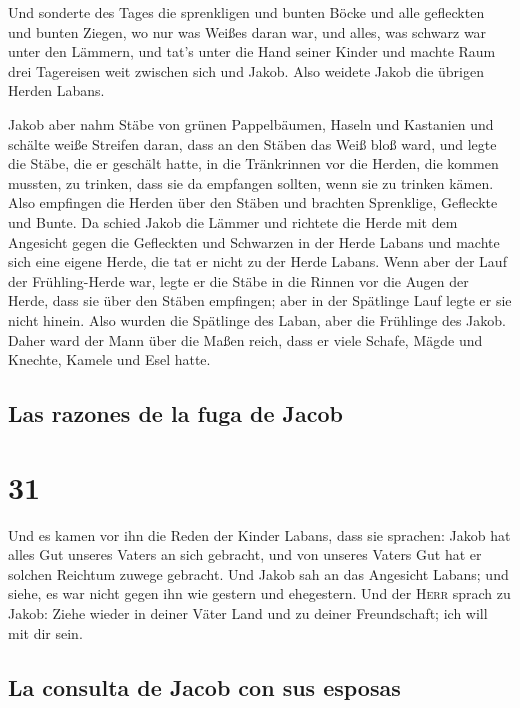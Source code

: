 Und sonderte des Tages die sprenkligen und bunten Böcke
und alle gefleckten und bunten Ziegen, wo nur was Weißes daran war, und
alles, was schwarz war unter den Lämmern, und tat's unter die Hand
seiner Kinder  und machte Raum drei Tagereisen weit
zwischen sich und Jakob. Also weidete Jakob die übrigen Herden Labans.

 Jakob aber nahm Stäbe von grünen Pappelbäumen, Haseln
und Kastanien und schälte weiße Streifen daran, dass an den Stäben das
Weiß bloß ward,  und legte die Stäbe, die er geschält
hatte, in die Tränkrinnen vor die Herden, die kommen mussten, zu
trinken, dass sie da empfangen sollten, wenn sie zu trinken kämen.
 Also empfingen die Herden über den Stäben und brachten
Sprenklige, Gefleckte und Bunte.  Da schied Jakob die
Lämmer und richtete die Herde mit dem Angesicht gegen die Gefleckten und
Schwarzen in der Herde Labans und machte sich eine eigene Herde, die tat
er nicht zu der Herde Labans.  Wenn aber der Lauf der
Frühling-Herde war, legte er die Stäbe in die Rinnen vor die Augen der
Herde, dass sie über den Stäben empfingen;  aber in der
Spätlinge Lauf legte er sie nicht hinein. Also wurden die Spätlinge des
Laban, aber die Frühlinge des Jakob.  Daher ward der Mann
über die Maßen reich, dass er viele Schafe, Mägde und Knechte, Kamele
und Esel hatte.

\hypertarget{las-razones-de-la-fuga-de-jacob}{%
\subsection{Las razones de la fuga de
Jacob}\label{las-razones-de-la-fuga-de-jacob}}

\hypertarget{section-30}{%
\section{31}\label{section-30}}

 Und es kamen vor ihn die Reden der Kinder Labans, dass
sie sprachen: Jakob hat alles Gut unseres Vaters an sich gebracht, und
von unseres Vaters Gut hat er solchen Reichtum zuwege gebracht.
 Und Jakob sah an das Angesicht Labans; und siehe, es war
nicht gegen ihn wie gestern und ehegestern.  Und der
\textsc{Herr} sprach zu Jakob: Ziehe wieder in deiner Väter Land und zu
deiner Freundschaft; ich will mit dir sein.

\hypertarget{la-consulta-de-jacob-con-sus-esposas}{%
\subsection{La consulta de Jacob con sus
esposas}\label{la-consulta-de-jacob-con-sus-esposas}}

